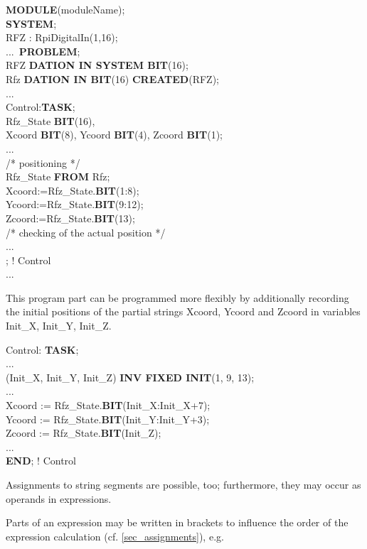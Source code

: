 {\bf MODULE}(moduleName);\\
{\bf SYSTEM};\\
\x RFZ : RpiDigitalIn(1,16);\\
\x ...\
{\bf PROBLEM};\\
 RFZ {\bf DATION IN SYSTEM BIT}(16);\\
 Rfz {\bf DATION IN BIT}(16) {\bf CREATED}(RFZ);\\
\x ...\\
\x Control:{\bf TASK};\\
\x {} Rfz\_State {\bf BIT}(16),\\
\x \x \x Xcoord {\bf BIT}(8), Ycoord {\bf BIT}(4), Zcoord {\bf BIT}(1);\\
\x \x ...\\
\x \x \x /* positioning */ \\
\x {} Rfz\_State {\bf FROM} Rfz;\\
\x \x Xcoord:=Rfz\_State.{\bf BIT}(1:8);\\
\x \x Ycoord:=Rfz\_State.{\bf BIT}(9:12);\\
\x \x Zcoord:=Rfz\_State.{\bf BIT}(13);\\
\x \x \x /* checking of the actual position */ \\
\x \x ...\\
; ! Control\\
\x ...


This program part can be programmed more flexibly by additionally
recording the initial positions of the partial strings Xcoord, Ycoord
and Zcoord in variables Init\_X, Init\_Y, Init\_Z.

Control: {\bf TASK};\\
\x ... \\
 (Init\_X, Init\_Y, Init\_Z) {\bf INV FIXED INIT}(1, 9, 13);\\
\x ... \\
\x Xcoord := Rfz\_State.{\bf BIT}(Init\_X:Init\_X+7);\\
\x Ycoord := Rfz\_State.{\bf BIT}(Init\_Y:Init\_Y+3);\\
\x Zcoord := Rfz\_State.{\bf BIT}(Init\_Z);\\
\x ... \\
{\bf END}; ! Control

Assignments to string segments are possible, too; furthermore, they may
occur as operands in expressions.

Parts of an expression may be written in brackets to influence the order
of the expression calculation (cf. \ref{sec_assignments}), e.g.

